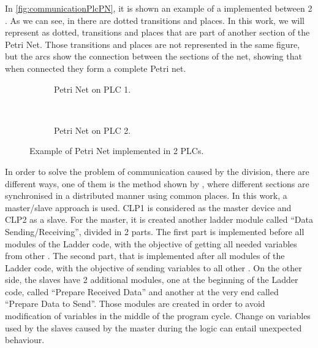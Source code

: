 In \autoref{fig:communicationPlcPN}, it is shown an example of a \CIPN{} implemented
between 2 \PLCs.
As we can see, in 
there are dotted transitions and places. In this work, we will represent as
dotted, transitions and places that are part of another section of the Petri
Net.
Those transitions and places are not represented in the same figure, 
but the arcs show the connection between the sections of the net, showing that
when connected they form a complete Petri net.
\begin{figure}[H]
  \centering
  \begin{subfigure}[t]{0.5\textwidth}
    \center
    \caption{Petri Net on PLC 1.}
    \label{fig:communicationPlcPN1}
  \end{subfigure}%
  ~
  \begin{subfigure}[t]{0.5\textwidth}
    \centering
    \caption{Petri Net on PLC 2.}
    \label{fig:communicationPlcPN2}
  \end{subfigure}
  \caption{Example of Petri Net implemented in 2 PLCs.}
  \label{fig:communicationPlcPN}
\end{figure}

In order to solve the problem of communication caused by the division, there are
different ways, one of them is the method shown by \cite{antunesfloriano2019sincronizacao}, where
different sections are synchronised in a distributed manner using common places.
In this work, a master\slash slave approach is used. CLP1 is considered as the
master device and CLP2 as a slave. For the master, it is created another ladder module
called ``Data Sending\slash Receiving'', divided in 2 parts.
The first part is implemented before all modules of the Ladder code, with the objective of getting all needed
variables from other \PLCs.
The second part, that is implemented after all modules of the Ladder code, with the objective of sending variables to all other \PLCs.
On the other side, the slaves have 2 additional modules, one at the beginning of
the Ladder code, called
``Prepare Received Data'' and another at the very end called ``Prepare Data to
Send''.
Those modules are created in order to avoid modification of variables in the
middle of the program cycle. Change on variables used by the
slaves \PLCs{} caused by the master during the logic can entail unexpected behaviour. 

